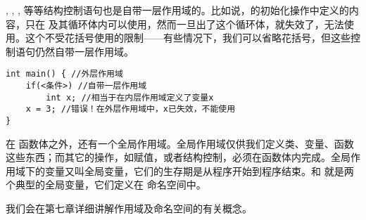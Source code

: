 \lstinline@if@, \lstinline@else@, \lstinline@for@, \lstinline@while@ 等等结构控制语句也是自带一层作用域的。比如说，\lstinline@for@ 的初始化操作中定义的内容，只在 \lstinline@for@ 及其循环体内可以使用，然而一旦出了这个循环体，\lstinline@i@ 就失效了，无法使用。这个不受花括号使用的限制——有些情况下，我们可以省略花括号，但这些控制语句仍然自带一层作用域。
\begin{lstlisting}
int main() { //外层作用域
    if(<条件>) //自带一层作用域
        int x; //相当于在内层作用域定义了变量x
    x = 3; //错误！在外层作用域中，x已失效，不能使用
}
\end{lstlisting}\par
在 \lstinline@main@ 函数体之外，还有一个全局作用域。全局作用域仅供我们定义类、变量、函数这些东西；而其它的操作，如赋值，或者结构控制，必须在函数体内完成。全局作用域下的变量又叫全局变量，它们的生存期是从程序开始到程序结束。\lstinline@cin@ 和 \lstinline@cout@ 就是两个典型的全局变量，它们定义在 \lstinline@std@ 命名空间中。\par
我们会在第七章详细讲解作用域及命名空间的有关概念。\par

